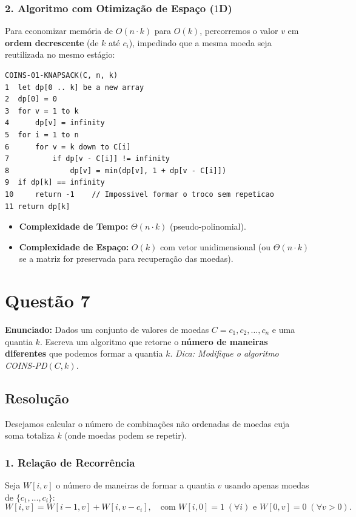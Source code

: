 \documentclass[11pt,a4paper]{article}
\begin{document}
\subsubsection*{2. Algoritmo com Otimização de Espaço ($1$D)}
Para economizar memória de $O(n \cdot k)$ para $O(k)$, percorremos o valor $v$ em \textbf{ordem decrescente} (de $k$ até $c_i$), impedindo que a mesma moeda seja reutilizada no mesmo estágio:

\begin{lstlisting}
COINS-01-KNAPSACK(C, n, k)
1  let dp[0 .. k] be a new array
2  dp[0] = 0
3  for v = 1 to k
4      dp[v] = infinity
5  for i = 1 to n
6      for v = k down to C[i]
7          if dp[v - C[i]] != infinity
8              dp[v] = min(dp[v], 1 + dp[v - C[i]])
9  if dp[k] == infinity
10     return -1    // Impossivel formar o troco sem repeticao
11 return dp[k]
\end{lstlisting}

\begin{itemize}
    \item \textbf{Complexidade de Tempo:} $\Theta(n \cdot k)$ (pseudo-polinomial).
    \item \textbf{Complexidade de Espaço:} $O(k)$ com vetor unidimensional (ou $\Theta(n \cdot k)$ se a matriz for preservada para recuperação das moedas).
\end{itemize}

\vspace{0.4cm}

\section*{Questão 7}
\textbf{Enunciado:} Dados um conjunto de valores de moedas $C = c_1, c_2, \dots, c_n$ e uma quantia $k$. Escreva um algoritmo que retorne o \textbf{número de maneiras diferentes} que podemos formar a quantia $k$. \emph{Dica: Modifique o algoritmo \textsc{COINS-PD}$(C, k)$.}

\subsection*{Resolução}

Desejamos calcular o número de combinações não ordenadas de moedas cuja soma totaliza $k$ (onde moedas podem se repetir). 

\subsubsection*{1. Relação de Recorrência}
Seja $W[i, v]$ o número de maneiras de formar a quantia $v$ usando apenas moedas de $\{c_1, \dots, c_i\}$:
\begin{equation}
W[i, v] = W[i-1, v] + W[i, v - c_i], \quad \text{com } W[i, 0] = 1 \; (\forall i) \text{ e } W[0, v] = 0 \; (\forall v > 0).
\end{equation}
\end{document}
